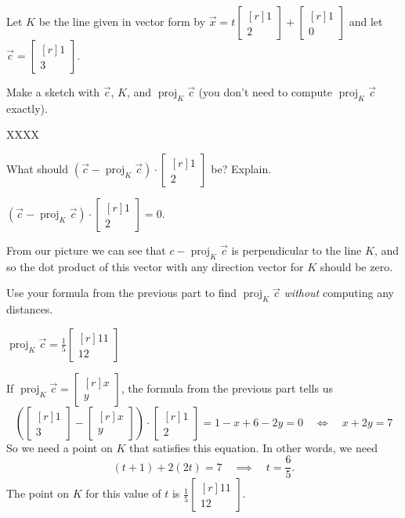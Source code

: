 \documentclass{problemset}
\DeclareMathOperator{\Proj}{proj}
\newcommand{\mat}[1]{\begin{bmatrix*}[r]#1\end{bmatrix*}}
\begin{document}
	\question
	Let $K$ be the line given in vector form by $\vec x=t\mat{1\\2}+\mat{1\\0}$ and let
	$\vec c=\mat{1\\3}$.
	\begin{parts}
		\item Make a sketch with $\vec c$, $K$, and $\Proj_K\vec c$ (you don't need to compute 
		$\Proj_K\vec c$ exactly).
			\begin{solution}
				XXXX
			\end{solution}
		\item What should $(\vec c-\Proj_K\vec c)\cdot \mat{1\\2}$ be? Explain.
			\begin{solution}
				$(\vec c-\Proj_K\vec c)\cdot \mat{1\\2} = 0$.

				From our picture we can see that $c-\Proj_K\vec c$ is perpendicular
				to the line $K$, and so the dot product of this vector with any 
				direction vector for $K$ should be zero.
			\end{solution}
		\item Use your formula from the previous part to find $\Proj_K\vec c$
			\emph{without} computing any distances.
			\begin{solution}
				$\Proj_K\vec c = \frac{1}{5}\mat{11\\12}$

				If $\Proj_K\vec c = \mat{x\\y}$, the formula from the previous
				part tells us
				\[
					\left(\mat{1\\3}-\mat{x\\y}\right)\cdot \mat{1\\2}
					=1-x+6-2y=0
					\quad \iff \quad
					x+2y=7
				\]
				So we need a point on $K$ that satisfies this equation. In other 
				words, we need
				\[
					(t+1) + 2(2t) = 7 \quad \implies \quad t = \frac{6}{5}.
				\]
				The point on $K$ for this value of $t$ is $\frac{1}{5}\mat{11\\12}$.
			\end{solution}
	\end{parts}
\end{document}

